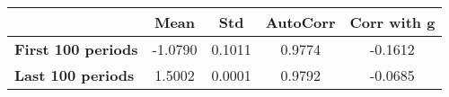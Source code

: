 \begin{tiny}\begin{tabular}{|l|c|c|c|c|}
\hline
&\textbf{Mean}&\textbf{Std}&\textbf{AutoCorr}&\textbf{Corr with g}\\\hline
\textbf{First 100 periods}&-1.0790&0.1011&0.9774&-0.1612\\\hline
\textbf{Last 100 periods}&1.5002&0.0001&0.9792&-0.0685\\\hline
\end{tabular}
\end{tiny}